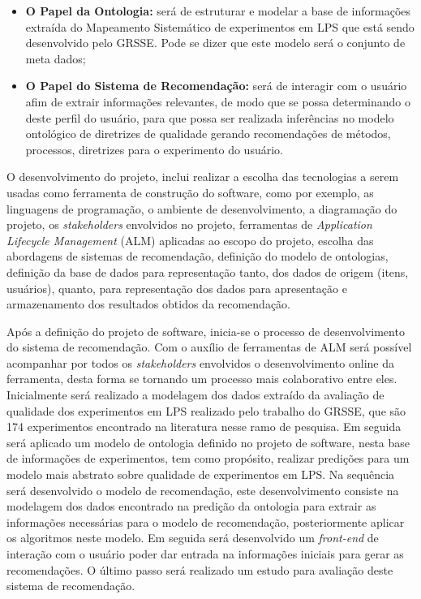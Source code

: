 \begin{itemize}
	\item \textbf{O Papel da Ontologia:} será de estruturar e modelar a base de informações extraída do Mapeamento Sistemático de experimentos em LPS que está sendo desenvolvido pelo GRSSE. Pode se dizer que este modelo será o conjunto de meta dados;
	
	\item \textbf{O Papel do Sistema de Recomendação:} será de interagir com o usuário afim de extrair informações relevantes, de modo que se possa determinando o deste perfil do usuário, para que possa ser realizada inferências no modelo ontológico de diretrizes de qualidade gerando recomendações de métodos, processos, diretrizes para o experimento do usuário.
\end{itemize}

O desenvolvimento do projeto, inclui realizar a escolha das tecnologias a serem usadas como ferramenta de construção do software, como por exemplo, as linguagens de programação, o ambiente de desenvolvimento, a diagramação do projeto, os \textit{stakeholders} envolvidos no projeto, ferramentas de \textit{Application Lifecycle Management} (ALM) aplicadas ao escopo do projeto, escolha das abordagens de sistemas de recomendação, definição do modelo de ontologias, definição da base de dados para representação tanto, dos dados de origem (itens, usuários), quanto, para representação dos dados para apresentação e armazenamento dos resultados obtidos da recomendação. 

Após a definição do projeto de software, inicia-se o processo de desenvolvimento do sistema de recomendação. Com o auxílio de ferramentas de ALM será possível acompanhar por todos os \textit{stakeholders} envolvidos o desenvolvimento online da ferramenta, desta forma se tornando um processo mais colaborativo entre eles. Inicialmente será realizado a modelagem dos dados extraído da avaliação de qualidade dos experimentos em LPS realizado pelo trabalho do GRSSE, que são 174 experimentos encontrado na literatura nesse ramo de pesquisa. Em seguida será aplicado um modelo de ontologia definido no projeto de software, nesta base de informações de experimentos, tem como propósito, realizar predições para um modelo mais abstrato sobre qualidade de experimentos em LPS. Na sequência será desenvolvido o modelo de recomendação, este desenvolvimento consiste na modelagem dos dados encontrado na predição da ontologia para extrair as informações necessárias para o modelo de recomendação, posteriormente aplicar os algoritmos neste modelo. Em seguida será desenvolvido um \textit{front-end} de interação com o usuário poder dar entrada na informações iniciais para gerar as recomendações. O último passo será realizado um estudo para avaliação deste sistema de recomendação.


